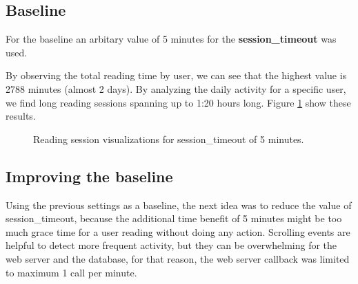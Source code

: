 \subsection{Baseline}
For the baseline an arbitary value of 5 minutes for the \textbf{session\_timeout} was used.

By observing the total reading time by user, we can see that the highest value is 2788 minutes (almost 2 days). By analyzing the daily activity for a specific user, we find long reading sessions spanning up to 1:20 hours long. Figure \ref{fig:visualizations_1st_iteration} show these results.

\begin{figure}[bth]
	\myfloatalign
	 \quad 
	 \quad
	\caption{Reading session visualizations for session\_timeout of 5 minutes.}\label{fig:visualizations_1st_iteration}
\end{figure}


\subsection{Improving the baseline}
Using the previous settings as a baseline, the next idea was to reduce the value of session\_timeout, because the additional time benefit of 5 minutes might be too much grace time for a user reading without doing any action. Scrolling events are helpful to detect more frequent activity, but they can be overwhelming for the web server and the database, for that reason, the web server callback was limited to maximum 1 call per minute.


